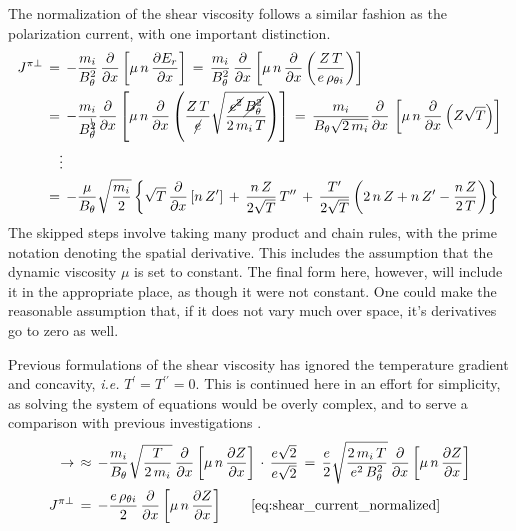 The normalization of the shear viscosity follows a similar fashion as the polarization current, with one important distinction.
\begin{align} %
	J^{\pi\perp} \,&=\, -\frac{m_i}{B_\theta^2} \,
		\frac{\partial}{\partial x} \left[\mu \, n \, \frac{\partial E_r}
		{\partial x}\right]
		\,=\, \frac{m_i}{B_\theta^2} \, \frac{\partial}{\partial x}
		\left[\mu \, n \, \frac{\partial}{\partial x} \left(\frac{Z \, T}
		{e \, \rho_{\theta i}}\right)\right] \\
	&=\, -\frac{m_i}{B_\theta^{\bcancel{2}}} \frac{\partial}{\partial x}
		\left[\mu \, n \, \frac{\partial}{\partial x}\left(\frac{Z \, T}
		{\cancel{e}} \sqrt{\frac{\cancel{e^2} \,
		\cancel{B_\theta^{2}}}{2 \, m_i \, T}}\right)\right]
		\,=\, \frac{m_i}{B_\theta \sqrt{2 \, m_i}}
		\frac{\partial}{\partial x} \, \left[\mu \, n \, \frac{\partial}
		{\partial x} \left(Z \sqrt{T}\right)\right] \\
	\nonumber&\quad\vdots \\
	&=\, -\frac{\mu}{B_\theta} \sqrt{\frac{m_i}{2}} \left\{\sqrt{T} \,
		\frac{\partial}{\partial x} \left[n \, Z^\prime\right] \,+\,
		\frac{n \, Z}{2\sqrt{T}} \, T^{\prime\prime} \,+\,
		\frac{T^\prime}{2\sqrt{T}} \left(2 \, n \, Z + n \, Z^\prime -
		\frac{n \, Z}{2 \, T}\right)\right\}
\end{align}
The skipped steps involve taking many product and chain rules, with the prime notation denoting the spatial derivative.
This includes the assumption that the dynamic viscosity $\mu$ is set to constant.
The final form here, however, will include it in the appropriate place, as though it were not constant.
One could make the reasonable assumption that, if it does not vary much over space, it's derivatives go to zero as well.

Previous formulations of the shear viscosity has ignored the temperature gradient and concavity, \emph{i.e.} $T^\prime = T^{\prime\prime} = 0$.
This is continued here in an effort for simplicity, as solving the system of equations would be overly complex, and to serve a comparison with previous investigations \cite{staps_backstepping_2017}.
\begin{align} %
	\rightarrow\, &\approx\, -\frac{m_i}{B_\theta}
		\sqrt{\frac{T}{2 \, m_i}} \, \frac{\partial}{\partial x} \left[\mu \,
		n \, \frac{\partial Z}{\partial x} \right] \,\cdot\,
		\frac{e\sqrt{2}}{e\sqrt{2}}
		\,=\, \frac{e}{2} \sqrt{\frac{2 \, m_i \, T}{e^2 \, B_\theta^2}}
		\, \frac{\partial}{\partial x} \left[\mu \, n \, \frac{\partial Z}
		{\partial x} \right] \\
	J^{\pi\perp} \,&=\, -\frac{e \, \rho_{\theta i}}{2} \,
		\frac{\partial}{\partial x} \left[\mu \, n \, \frac{\partial Z}
		{\partial x}\right] \tag*{\eqref{eq:shear_current_normalized}}
\end{align}

